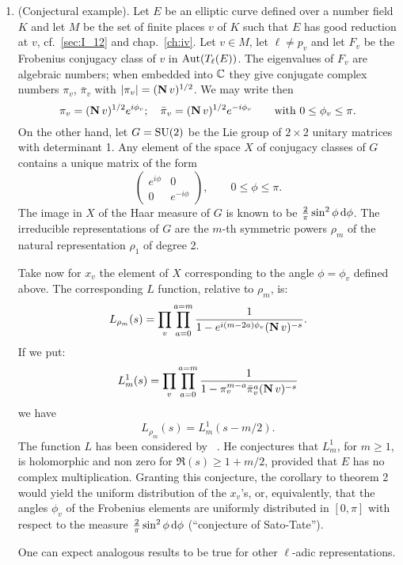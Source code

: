 \begin{subappendices}
\begin{enumerate}[resume*=ex_IA3]
\item (Conjectural example).
	Let $E$ be an elliptic curve defined over a number field $K$ and let
	$M$ be the set of finite places $v$ of $K$ such that $E$ has good
	reduction at $v$, cf.\ \ref{sec:I_12} and chap.~\ref{ch:iv}.  Let $v
	\in M$, let $\ell \ne p_v$ and let $F_v$ be the Frobenius conjugacy
	class of $v$ in $\operatorname{Aut}(T_\ell(E))$. The eigenvalues of $F_v$ are
	algebraic numbers; when embedded into $\mathbb{C}$ they give conjugate complex
	numbers $\pi_v$, $\bar{\pi}_v$ with $|\pi_v| = (\operatorname{\mathbf{N}} v)^{1/2}$.  We
	may write then
	\[
		\pi_v = (\operatorname{\mathbf{N}} v)^{1/2} e^{i \phi_v}; \quad
		\bar{\pi}_v = (\operatorname{\mathbf{N}} v)^{1/2} e^{-i \phi_v} \qquad
		\text{with } 0 \le \phi_v \le \pi.
	\]
	On the other hand, let $G = \operatorname{SU}(2)$ be the Lie group of $2 \times 2$
	unitary matrices with determinant 1. Any element of the space $X$ of
	conjugacy classes of $G$ contains a unique matrix of the form
	\[
		\begin{pmatrix}
			e^{i \phi} & 0 \\
			0 & e^{-i \phi}
		\end{pmatrix}, \qquad 0 \le \phi \le \pi.
	\]
	The image in $X$ of the Haar measure of $G$ is known to be
	$\frac{2}{\pi}\sin^2 \phi \, \mathrm{d}\phi$.  The irreducible
	representations of $G$ are the $m$-th symmetric powers $\rho_m$ of the
	natural representation $\rho_1$ of degree 2.

	Take now for $x_v$ the element of $X$ corresponding to the angle
	$\phi = \phi_v$ defined above. The corresponding $L$ function,
	relative to $\rho_m$, is:
	\[
		L_{\rho_m}(s) = \prod_{v} \prod_{a=0}^{a=m} \frac{1}{ 1 -
		e^{i(m - 2a)\phi_v} (\operatorname{\mathbf{N}} v)^{-s} }.
	\]
	If we put:
	\[
		L_m^1(s) = \prod_{v} \prod_{a=0}^{a=m} \frac{1}{ 1 -
		\pi_v^{m-a} \bar{\pi}_v^a (\operatorname{\mathbf{N}} v)^{-s} }
	\]
	\dpage
	we have
	\[
		L_{\rho_m}(s) = L_m^1(s - m/2).
	\]
	The function $L$ has been considered by \citeauthor{36}~\cite{36}. He
	conjectures that $L_m^1$, for $m \ge 1$, is holomorphic and non zero
	for $\Re(s) \ge 1 + m/2$, provided that $E$ has no complex
	multiplication. Granting this conjecture, the corollary to theorem 2
	would yield the uniform distribution of the $x_v$'s, or, equivalently,
	that the angles $\phi_v$ of the Frobenius elements are uniformly
	distributed in $[0, \pi]$ with respect to the measure
	$\frac{2}{\pi}\sin^2 \phi \, \mathrm{d}\phi$ (``conjecture of
	Sato-Tate'').

	One can expect analogous results to be true for other $\ell$-adic
	representations.
\end{enumerate}


\end{subappendices}
